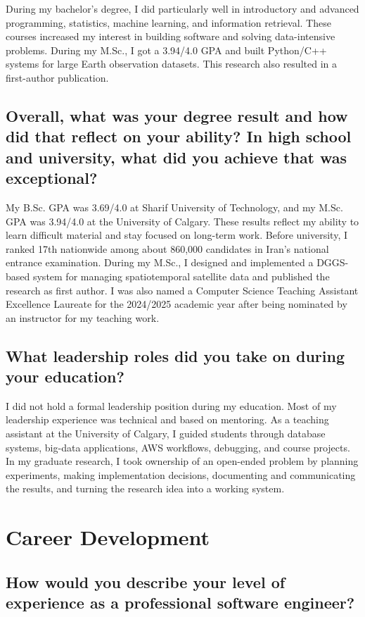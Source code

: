 \documentclass[11pt]{article}
\begin{document}
During my bachelor's degree, I did particularly well in introductory and advanced programming, statistics, machine learning, and information retrieval. These courses increased my interest in building software and solving data-intensive problems. During my M.Sc., I got a 3.94/4.0 GPA and built Python/C++ systems for large Earth observation datasets. This research also resulted in a first-author publication.

\subsection*{Overall, what was your degree result and how did that reflect on your ability? In high school and university, what did you achieve that was exceptional?}

My B.Sc. GPA was 3.69/4.0 at Sharif University of Technology, and my M.Sc. GPA was 3.94/4.0 at the University of Calgary. These results reflect my ability to learn difficult material and stay focused on long-term work. Before university, I ranked 17th nationwide among about 860,000 candidates in Iran's national entrance examination. During my M.Sc., I designed and implemented a DGGS-based system for managing spatiotemporal satellite data and published the research as first author. I was also named a Computer Science Teaching Assistant Excellence Laureate for the 2024/2025 academic year after being nominated by an instructor for my teaching work.

\subsection*{What leadership roles did you take on during your education?}

I did not hold a formal leadership position during my education. Most of my leadership experience was technical and based on mentoring. As a teaching assistant at the University of Calgary, I guided students through database systems, big-data applications, AWS workflows, debugging, and course projects. In my graduate research, I took ownership of an open-ended problem by planning experiments, making implementation decisions, documenting and communicating the results, and turning the research idea into a working system.

\section*{Career Development}

\subsection*{How would you describe your level of experience as a professional software engineer?}
\end{document}
